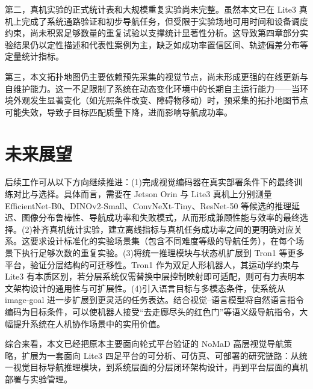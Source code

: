 第二，真机实验的正式统计表和大规模重复实验尚未完整。虽然本文已在 Lite3 真机上完成了系统通路验证和初步导航任务，但受限于实验场地可用时间和设备调度约束，尚未积累足够数量的重复试验以支撑统计显著性分析。这导致第四章部分实验结果仍以定性描述和代表性案例为主，缺乏如成功率置信区间、轨迹偏差分布等定量统计指标。

第三，本文拓扑地图仍主要依赖预先采集的视觉节点，尚未形成更强的在线更新与自维护能力。这一不足限制了系统在动态变化环境中的长期自主运行能力——当环境外观发生显著变化（如光照条件改变、障碍物移动）时，预采集的拓扑地图节点可能失效，导致子目标匹配质量下降，进而影响导航成功率。

\section{未来展望}

后续工作可从以下方向继续推进：(1)完成视觉编码器在真实部署条件下的最终训练对比与选择。具体而言，需要在 Jetson Orin 与 Lite3 真机上分别测量 EfficientNet-B0、DINOv2-Small、ConvNeXt-Tiny、ResNet-50 等候选的推理延迟、图像分布鲁棒性、导航成功率和失败模式，从而形成兼顾性能与效率的最终选择。(2)补齐真机统计实验，建立离线指标与真机任务成功率之间的更明确对应关系。这要求设计标准化的实验场景集（包含不同难度等级的导航任务），在每个场景下执行足够次数的重复实验。(3)将统一推理模块与状态机扩展到 Tron1 等更多平台，验证分层结构的可迁移性。Tron1 作为双足人形机器人，其运动学约束与 Lite3 有本质区别，若分层系统仅需替换中层控制映射即可适配，则可有力表明本文架构设计的通用性与可扩展性。(4)引入语言目标与多模态条件，使系统从 image-goal 进一步扩展到更灵活的任务表达。结合视觉--语言模型将自然语言指令编码为目标条件，可以使机器人接受``去走廊尽头的红色门''等语义级导航指令，大幅提升系统在人机协作场景中的实用价值。


综合来看，本文已经把原本主要面向轮式平台验证的 NoMaD 高层视觉导航策略，扩展为一套面向 Lite3 四足平台的可分析、可仿真、可部署的研究链路：从统一视觉目标导航推理模块，到系统层面的分层闭环架构设计，再到平台层面的真机部署与实验管理。
